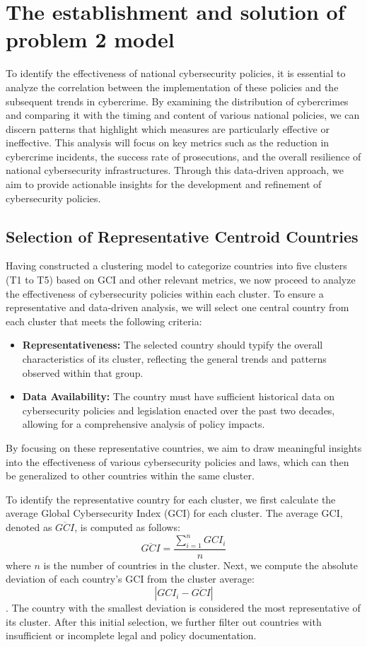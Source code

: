 \documentclass[12pt]{article}
\begin{document}
\section{The establishment and solution of problem 2 model}\label{sec:the-establishment-and-solution-of-problem-2-model} %
	To identify the effectiveness of national cybersecurity policies,
	it is essential to analyze the correlation between the implementation of these policies and the subsequent trends in cybercrime.
	By examining the distribution of cybercrimes and comparing it with the timing and content of various national policies,
	we can discern patterns that highlight which measures are particularly effective or ineffective.
	This analysis will focus on key metrics such as the reduction in
	cybercrime incidents, the success rate of prosecutions, and the overall resilience of national cybersecurity infrastructures.
	Through this data-driven approach,
	we aim to provide actionable insights for the development and refinement of cybersecurity policies.
	\subsection{Selection of Representative Centroid Countries}\label{subsec:selection-of-representative centroid-countries} %
		Having constructed a clustering model to categorize countries into five clusters (T1 to T5) based on GCI and other relevant metrics,
		we now proceed to analyze the effectiveness of cybersecurity policies within each cluster.
		To ensure a representative and data-driven analysis,
		we will select one central country from each cluster that meets the following criteria:
		\begin{itemize}
			\item \textbf{Representativeness:}
				The selected country should typify the overall characteristics of its cluster,
				reflecting the general trends and patterns observed within that group.
			\item \textbf{Data Availability:}
				The country must have sufficient historical data on cybersecurity policies and legislation enacted over the past two decades,
				allowing for a comprehensive analysis of policy impacts.
		\end{itemize}
		By focusing on these representative countries,
		we aim to draw meaningful insights into the effectiveness of various cybersecurity policies and laws,
		which can then be generalized to other countries within the same cluster.

		To identify the representative country for each cluster,
		we first calculate the average Global Cybersecurity Index (GCI) for each cluster.
		The average GCI, denoted as \(\overline{GCI}\), is computed as follows:
		\[ \overline{GCI} = \frac{\sum_{i=1}^{n} GCI_i}{n} \]
		where \(n\) is the number of countries in the cluster.
		Next, we compute the absolute deviation of each country's GCI from the cluster average:
		\[|GCI_i - \overline{GCI}|\] .
		The country with the smallest deviation is considered the most representative of its cluster.
		After this initial selection, we further filter out countries with insufficient or incomplete legal and policy documentation.
\end{document}
